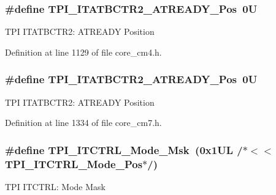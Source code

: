 \subsubsection[{\texorpdfstring{T\+P\+I\+\_\+\+I\+T\+A\+T\+B\+C\+T\+R2\+\_\+\+A\+T\+R\+E\+A\+D\+Y\+\_\+\+Pos}{TPI_ITATBCTR2_ATREADY_Pos}}]{\setlength{\rightskip}{0pt plus 5cm}\#define T\+P\+I\+\_\+\+I\+T\+A\+T\+B\+C\+T\+R2\+\_\+\+A\+T\+R\+E\+A\+D\+Y\+\_\+\+Pos~0U}\hypertarget{group___c_m_s_i_s___t_p_i_ga6959f73d7db4a87ae9ad9cfc99844526}{}\label{group___c_m_s_i_s___t_p_i_ga6959f73d7db4a87ae9ad9cfc99844526}
T\+PI I\+T\+A\+T\+B\+C\+T\+R2\+: A\+T\+R\+E\+A\+DY Position 

Definition at line 1129 of file core\+\_\+cm4.\+h.

\subsubsection[{\texorpdfstring{T\+P\+I\+\_\+\+I\+T\+A\+T\+B\+C\+T\+R2\+\_\+\+A\+T\+R\+E\+A\+D\+Y\+\_\+\+Pos}{TPI_ITATBCTR2_ATREADY_Pos}}]{\setlength{\rightskip}{0pt plus 5cm}\#define T\+P\+I\+\_\+\+I\+T\+A\+T\+B\+C\+T\+R2\+\_\+\+A\+T\+R\+E\+A\+D\+Y\+\_\+\+Pos~0U}\hypertarget{group___c_m_s_i_s___t_p_i_ga6959f73d7db4a87ae9ad9cfc99844526}{}\label{group___c_m_s_i_s___t_p_i_ga6959f73d7db4a87ae9ad9cfc99844526}
T\+PI I\+T\+A\+T\+B\+C\+T\+R2\+: A\+T\+R\+E\+A\+DY Position 

Definition at line 1334 of file core\+\_\+cm7.\+h.

\subsubsection[{\texorpdfstring{T\+P\+I\+\_\+\+I\+T\+C\+T\+R\+L\+\_\+\+Mode\+\_\+\+Msk}{TPI_ITCTRL_Mode_Msk}}]{\setlength{\rightskip}{0pt plus 5cm}\#define T\+P\+I\+\_\+\+I\+T\+C\+T\+R\+L\+\_\+\+Mode\+\_\+\+Msk~(0x1\+U\+L /$\ast$$<$$<$ T\+P\+I\+\_\+\+I\+T\+C\+T\+R\+L\+\_\+\+Mode\+\_\+\+Pos$\ast$/)}\hypertarget{group___c_m_s_i_s___t_p_i_gad6f87550b468ad0920d5f405bfd3f017}{}\label{group___c_m_s_i_s___t_p_i_gad6f87550b468ad0920d5f405bfd3f017}
T\+PI I\+T\+C\+T\+RL\+: Mode Mask 


